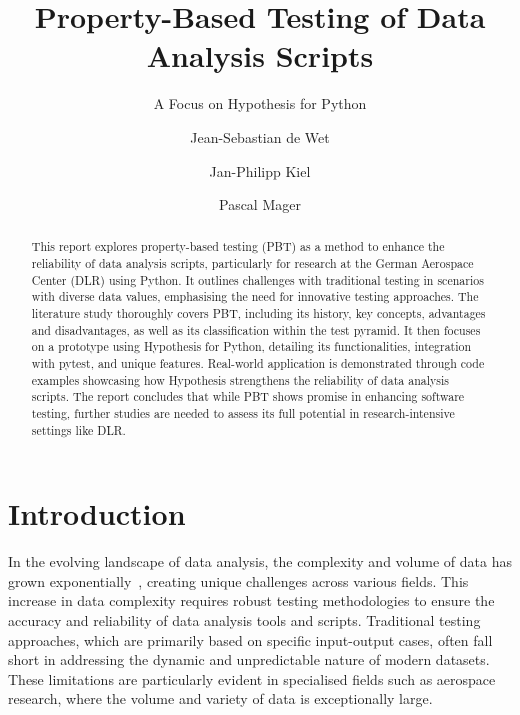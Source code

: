 \documentclass[runningheads]{llncs}
\begin{document}
%
\title{Property-Based Testing of Data Analysis Scripts}
\subtitle{A Focus on Hypothesis for Python}
%
%
\author{Jean-Sebastian de Wet \and
  Jan-Philipp Kiel \and
  Pascal Mager}
%
%
%
\maketitle              %
%
\begin{abstract}
  This report explores property-based testing (PBT) as a meth\-od to enhance the reliability of data analysis scripts, particularly for research at the German Aerospace Center (DLR) using Python. It outlines challenges with traditional testing in scenarios with diverse data values, emphasising the need for innovative testing approaches. The literature study thoroughly covers PBT, including its history, key concepts, advantages and disadvantages, as well as its classification within the test pyramid. It then focuses on a prototype using Hypothesis for Python, detailing its functionalities, integration with pytest, and unique features. Real-world application is demonstrated through code examples showcasing how Hypothesis strengthens the reliability of data analysis scripts. The report concludes that while PBT shows promise in enhancing software testing, further studies are needed to assess its full potential in research-intensive settings like DLR.

\end{abstract}
%
%
%
\section{Introduction}
In the evolving landscape of data analysis, the complexity and volume of data has grown exponentially~\cite{Taylor2023}, creating unique challenges across various fields. This increase in data complexity requires robust testing methodologies to ensure the accuracy and reliability of data analysis tools and scripts. Traditional testing approaches, which are primarily based on specific input-output cases, often fall short in addressing the dynamic and unpredictable nature of modern datasets. These limitations are particularly evident in specialised fields such as aerospace research, where the volume and variety of data is exceptionally large.
\end{document}

